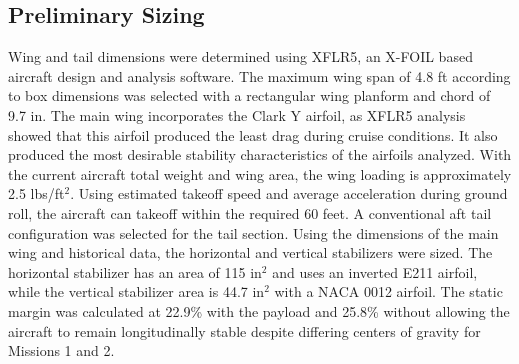 \subsection{Preliminary Sizing}
Wing and tail dimensions were determined using XFLR5, an X-FOIL based aircraft design and analysis software. The maximum wing span of 4.8 ft according to box dimensions was selected with a rectangular wing planform and chord of 9.7 in. The main wing incorporates the Clark Y airfoil, as XFLR5 analysis showed that this airfoil produced the least drag during cruise conditions. It also produced the most desirable stability characteristics of the airfoils analyzed. With the current aircraft total weight and wing area, the wing loading is approximately 2.5 lbs/ft$^2$. Using estimated takeoff speed and average acceleration during ground roll, the aircraft can takeoff within the required 60 feet. A conventional aft tail configuration was selected for the tail section. Using the dimensions of the main wing and historical data, the horizontal and vertical stabilizers were sized. The horizontal stabilizer has an area of 115 in$^2$ and uses an inverted E211 airfoil, while the vertical stabilizer area is 44.7 in$^2$ with a NACA 0012 airfoil. The static margin was calculated at 22.9\% with the payload and 25.8\% without allowing the aircraft to remain longitudinally stable despite differing centers of gravity for Missions 1 and 2.\\
